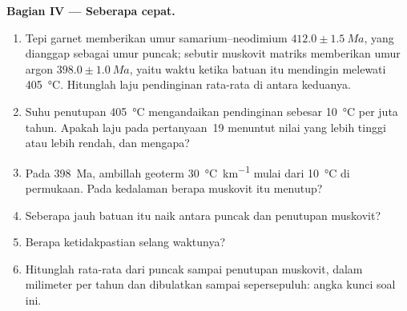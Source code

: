 \begin{problem}
\noindent\textbf{Bagian IV --- Seberapa cepat.}
\begin{enumerate}[resume]
\item Tepi garnet memberikan umur samarium--neodimium $412.0 \pm \qty{1.5}{Ma}$, yang dianggap
sebagai umur puncak; sebutir muskovit matriks memberikan umur argon $398.0 \pm
\qty{1.0}{Ma}$, yaitu waktu ketika batuan itu mendingin melewati \qty{405}{\celsius}. Hitunglah
laju pendinginan rata-rata di antara keduanya.
\item Suhu penutupan \qty{405}{\celsius} mengandaikan pendinginan sebesar
\qty{10}{\celsius} per juta tahun. Apakah laju pada pertanyaan~19 menuntut nilai yang lebih tinggi atau
lebih rendah, dan mengapa?
\item Pada \qty{398}{Ma}, ambillah geoterm \qty{30}{\celsius\per\km} mulai dari
\qty{10}{\celsius} di permukaan. Pada kedalaman berapa muskovit itu menutup?
\item Seberapa jauh batuan itu naik antara puncak dan penutupan muskovit?
\item Berapa ketidakpastian selang waktunya?
\item Hitunglah  rata-rata dari puncak sampai penutupan muskovit, dalam
milimeter per tahun dan dibulatkan sampai sepersepuluh: angka kunci soal ini.
\end{enumerate}
\end{problem}
